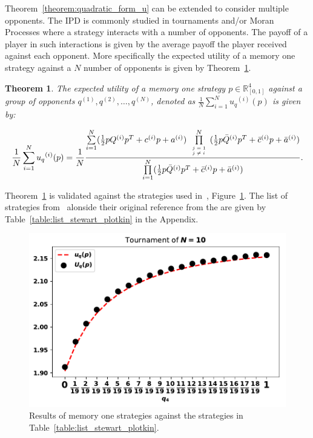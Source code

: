 \documentclass[10pt]{article}
\newtheorem{theorem}{Theorem}
\begin{document}
Theorem~\ref{theorem:quadratic_form_u} can be extended to consider multiple
opponents. The IPD is commonly studied in tournaments and/or Moran Processes
where a strategy interacts with a number of opponents. The payoff of a player in
such interactions is given by the average payoff the player received against
each opponent. More specifically the expected utility of a memory one strategy
against a \(N\) number of opponents is given by
Theorem~\ref{theorem:tournament_utility}.

\begin{theorem}\label{theorem:tournament_utility}
    The expected utility of a memory one strategy \(p\in\mathbb{R}_{[0,1]}^4\)
    against a group of opponents \(q^{(1)}, q^{(2)}, \dots, q^{(N)}\), denoted
    as \(\frac{1}{N} \sum\limits_{i=1} ^ {N} {u_q}^{(i)} (p)\) is given by:

    \begin{equation}\label{eq:tournament_utility}
        \frac{1}{N} \sum\limits_{i=1} ^ {N} {u_q}^{(i)} (p) = \frac{1}{N}
        \frac{\sum\limits_{i=1} ^ {N} (\frac{1}{2} pQ^{(i)} p^T + c^{(i)} p + a^ {(i)})
        \prod\limits_{\tiny\begin{array}{l} j=1 \\ j \neq i \end{array}} ^
        N (\frac{1}{2} p\bar{Q}^{(i)} p^T + \bar{c}^{(i)} p + \bar{a}^ {(i)})}
        {\prod\limits_{i=1} ^ N (\frac{1}{2} p\bar{Q}^{(i)} p^T + \bar{c}^{(i)} p + \bar{a}^ {(i)})}.
    \end{equation}
\end{theorem}

Theorem~\ref{theorem:tournament_utility} is validated against the strategies
used in~\cite{Stewart2012}, Figure~\ref{fig:stewart_plotkin_results}. The
list of strategies from~\cite{Stewart2012} alonside their original reference from the 
are given by Table~\ref{table:list_stewart_plotkin} in the Appendix.

\begin{figure}[!htbp]
    \begin{center}
    \includegraphics[width=.5\linewidth]{img/Stewart_tournament_results.pdf}
    \caption{Results of memory one strategies against the strategies in
    Table~\ref{table:list_stewart_plotkin}.}
    \label{fig:stewart_plotkin_results}
    \end{center}
\end{figure}
\end{document}
